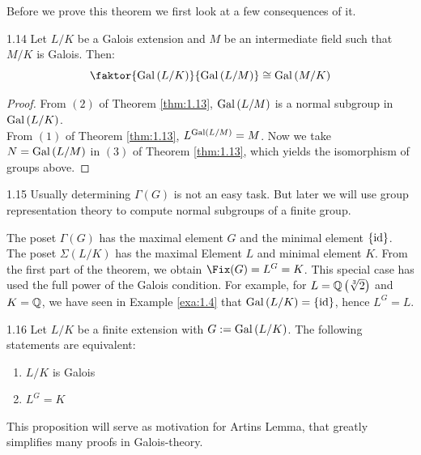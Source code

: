 \documentclass[twoside = false,	%
		headsepline,		%
		parskip = true,
		]{scrbook}						%
\begin{document}
        Before we prove this theorem we first look at a few consequences of it.
        
        \begin{corollary}{}{1.14}
            Let $L/K$ be a Galois extension and $M$ be an intermediate field such that $M/K$ is Galois. Then:
            \begin{equation*}
                \faktor{\Gal{L/K}}{\Gal{L/M}} \cong \Gal{M/K}
            \end{equation*}
        \end{corollary}
        
        \begin{proof}
            From $(2)$ of Theorem \ref{thm:1.13}, $\mathrm{Gal}\left( L/M\right)$ is a normal subgroup in $\mathrm{Gal}\left( L/K\right)$.\\ From $(1)$ of Theorem \ref{thm:1.13}, $L^{\mathrm{Gal}\left( L/M\right)} = M$. Now we take $N = \mathrm{Gal}\left( L/M\right)$ in $(3)$ of Theorem \ref{thm:1.13}, which yields the isomorphism of groups above.
        \end{proof}
        
        \begin{remark}{}{1.15}
            Usually determining $\Gamma(G)$ is not an easy task. But later we will use group representation theory to compute normal subgroups of a finite group.
        \end{remark}
        
        The poset $\Gamma(G)$ has the maximal element $G$ and the minimal element $\left\{ \mathrm{id}\right\}$. The poset $\Sigma(L/K)$ has the maximal Element $L$ and minimal element $K$. From the first part of the theorem, we obtain $\Fix(G)=L^G=K$. This special case has used the full power of the Galois condition. For example, for $L=\mathbb Q\left( \sqrt[3]2\right)$ and $K=\mathbb Q$, we have seen in Example \ref{exa:1.4} that $\mathrm{Gal}\left( L/K\right)=\left\{ \mathrm{id}\right\}$, hence $L^G=L$.


        \begin{proposition}{}{1.16}
            Let $L/K$ be a finite extension with $G:=\mathrm{Gal}\left( L/K\right)$. The following statements are equivalent:
            \begin{enumerate}
                \item $L/K$ is Galois
                \item $L^G=K$
            \end{enumerate}
        \end{proposition}

        This proposition will serve as motivation for Artins Lemma, that greatly simplifies many proofs in Galois-theory. 
        
\end{document}

